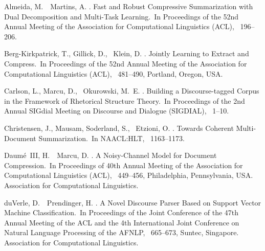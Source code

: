 \documentclass[japanese]{jnlp_1.4}
\begin{document}

\begin{thebibliography}{}

Almeida, M.\BBACOMMA\ \BBA\ Martins, A. \BBCP.
\newblock \BBOQ Fast and Robust Compressive Summarization with Dual
  Decomposition and Multi-Task Learning.\BBCQ\
\newblock In {\Bem Proceedings of the 52nd Annual Meeting of the Association
  for Computational Linguistics (ACL)}, \mbox{\BPGS\ 196--206}.

Berg-Kirkpatrick, T., Gillick, D., \BBA\ Klein, D. \BBOP 2011\BBCP.
\newblock \BBOQ Jointly Learning to Extract and Compress.\BBCQ\
\newblock In {\Bem Proceedings of the 52nd Annual Meeting of the Association
  for Computational Linguistics (ACL)}, \mbox{\BPGS\ 481--490}, Portland,
  Oregon, USA.

Carlson, L., Marcu, D., \BBA\ Okurowski, M.~E. \BBCP.
\newblock \BBOQ Building a Discourse-tagged Corpus in the Framework of
  Rhetorical Structure Theory.\BBCQ\
\newblock In {\Bem Proceedings of the 2nd Annual SIGdial Meeting on Discourse
  and Dialogue (SIGDIAL)}, \mbox{\BPGS\ 1--10}.

Christensen, J., Mausam, Soderland, S., \BBA\ Etzioni, O. \BBOP 2013\BBCP.
\newblock \BBOQ Towards Coherent Multi-Document Summarization.\BBCQ\
\newblock In {\Bem NAACL:HLT}, \mbox{\BPGS\ 1163--1173}.

Daum{\'e}{\ }III, H.\BBACOMMA\ \BBA\ Marcu, D. \BBCP.
\newblock \BBOQ A Noisy-Channel Model for Document Compression.\BBCQ\
\newblock In {\Bem Proceedings of 40th Annual Meeting of the Association for
  Computational Linguistics (ACL)}, \mbox{\BPGS\ 449--456}, Philadelphia,
  Pennsylvania, USA. Association for Computational Linguistics.

duVerle, D.\BBACOMMA\ \BBA\ Prendinger, H. \BBCP.
\newblock \BBOQ A Novel Discourse Parser Based on Support Vector Machine
  Classification.\BBCQ\
\newblock In {\Bem Proceedings of the Joint Conference of the 47th Annual
  Meeting of the ACL and the 4th International Joint Conference on Natural
  Language Processing of the AFNLP}, \mbox{\BPGS\ 665--673}, Suntec, Singapore.
  Association for Computational Linguistics.


\end{thebibliography}
\end{document}
